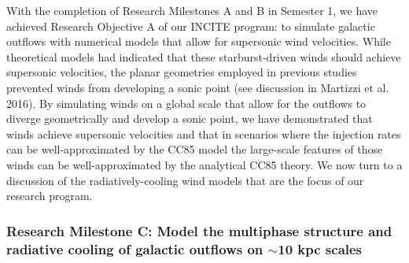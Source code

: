 \documentclass[11pt,letterpaper,english]{article}
\begin{document}
With the completion of Research Milestones A and B in Semester 1, we have achieved Research Objective A of our INCITE program: to simulate galactic outflows with numerical models that allow for supersonic wind velocities. While theoretical models had indicated that these starburst-driven winds should achieve supersonic velocities, the planar geometries employed in previous studies prevented winds from developing a sonic point (see discussion in Martizzi et al. 2016). By simulating winds on a global scale that allow
for the outflows to diverge geometrically and develop a sonic point, we have demonstrated that winds achieve supersonic velocities and that in scenarios where the injection rates can be well-approximated by the CC85 model the large-scale features of those winds can be well-approximated by the analytical CC85 theory. We now turn to a discussion of the radiatively-cooling wind models that are the focus of our research program.



\subsubsection{Research Milestone C: Model the multiphase structure and radiative cooling of galactic outflows on $\sim$10 kpc scales}
\end{document}
